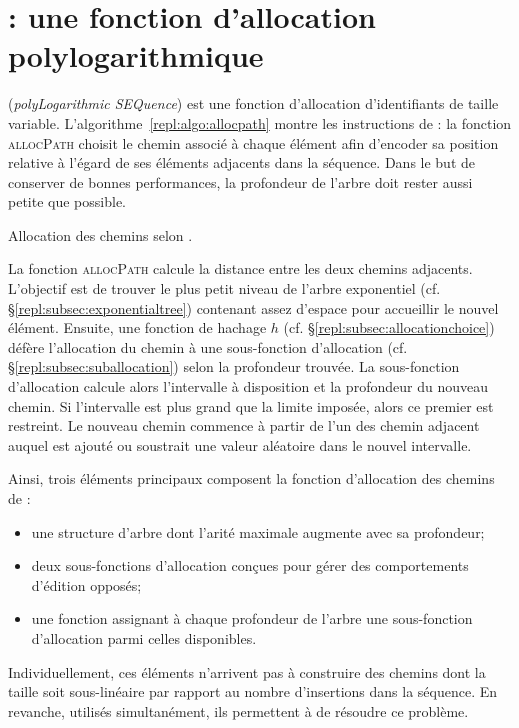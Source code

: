 
\section{\LSEQ : une fonction d'allocation polylogarithmique}
\label{repl:sec:proposal}

\LSEQ (\emph{polyLogarithmic SEQuence}) est une fonction d'allocation
d'identifiants de taille variable. L'algorithme~\ref{repl:algo:allocpath} montre
les instructions de \LSEQ : la fonction \textsc{allocPath} choisit le chemin
associé à chaque élément afin d'encoder sa position relative à l'égard de ses
éléments adjacents dans la séquence. Dans le but de conserver de bonnes
performances, la profondeur de l'arbre doit rester aussi petite que possible.

\begin{algorithm}
  
  \caption[Allocation des chemins selon \LSEQ]
  {\label{repl:algo:allocpath}Allocation des chemins selon \LSEQ.}
\end{algorithm}

La fonction \textsc{allocPath} calcule la distance entre les deux chemins
adjacents. L'objectif est de trouver le plus petit niveau de l'arbre exponentiel
(cf. §\ref{repl:subsec:exponentialtree}) contenant assez d'espace pour
accueillir le nouvel élément.  Ensuite, une fonction de hachage $h$
(cf. §\ref{repl:subsec:allocationchoice}) défère l'allocation du chemin à une
sous-fonction d'allocation (cf. §\ref{repl:subsec:suballocation}) selon la
profondeur trouvée.  La sous-fonction d'allocation calcule alors l'intervalle à
disposition et la profondeur du nouveau chemin. Si l'intervalle est plus grand
que la limite imposée, alors ce premier est restreint. Le nouveau chemin
commence à partir de l'un des chemin adjacent auquel est ajouté ou soustrait une
valeur aléatoire dans le nouvel intervalle.


Ainsi, trois éléments principaux composent la fonction d'allocation des chemins
de \LSEQ :
\begin{itemize}[(i)]
\item une structure d'arbre dont l'arité maximale augmente avec sa
  profondeur;
\item deux sous-fonctions d'allocation conçues pour gérer des comportements
  d'édition opposés;
\item une fonction assignant à chaque profondeur de l'arbre une sous-fonction
  d'allocation parmi celles disponibles.
\end{itemize}
Individuellement, ces éléments n'arrivent pas à construire des chemins dont la
taille soit sous-linéaire par rapport au nombre d'insertions dans la
séquence. En revanche, utilisés simultanément, ils permettent à \LSEQ de
résoudre ce problème.


